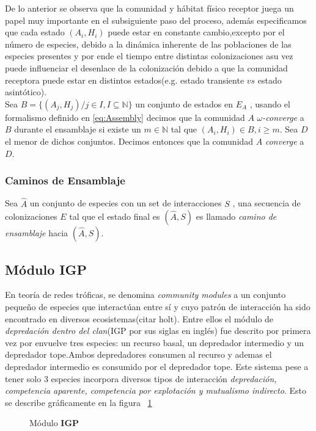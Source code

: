 De lo anterior se observa que la comunidad y h\'abitat f\'isico receptor juega un papel muy importante en el subsiguiente paso del proceso, adem\'as especificamos que cada estado $(A_i,H_i)$ puede estar en constante cambio,excepto por el n\'umero de especies, debido a la din\'amica inherente de las poblaciones de las especies presentes y por ende el tiempo entre distintas colonizaciones asu vez puede influenciar el desenlace de la colonizaci\'on debido a que la comunidad receptora puede estar en distintos estados(e.g. estado transiente $vs$ estado asint\'otico).\\

Sea $B = \{ (A_j,H_j) / j \in I, I \subseteq \mathbb{N}\}$ un conjunto de estados en $E_A$ , usando el formalismo definido en \eqref{eq:Assembly} decimos que la comunidad $A$ \emph{$\omega$-converge} a $B$ durante el ensamblaje si existe un $ m \in \mathbb{N}$ tal que $(A_i,H_i) \in B, i \geq m$. Sea $D$ el menor de dichos conjuntos. Decimos entonces que la comunidad $A$ \emph{converge} a $D$.

\subsubsection{Caminos de Ensamblaje}
Sea $\hat{A}$ un conjunto de especies con un set de interacciones $S$ , una secuencia de colonizaciones $E$ tal que el estado final es $(\hat{A},S)$ es llamado \emph{camino de ensamblaje} hacia $(\hat{A},S)$.

\subsection{ M\'odulo IGP}

En teor\'ia de redes tr\'oficas, se denomina \emph{community modules} a un conjunto peque\~no de especies que interact\'uan entre s\'i y cuyo patr\'on de interacci\'on ha sido encontrado en diversos ecosistemas(citar holt). Entre ellos el m\'odulo de \emph{depredaci\'on dentro del clan}(IGP por sus siglas en ingl\'es) fue descrito por primera vez por \cite{polis1989ecology} envuelve tres especies: un recurso basal, un depredador intermedio y un depredador tope.Ambos depredadores consumen al recurso y ademas el depredador intermedio es consumido por el depredador tope. Este sistema pese a tener solo $3$ especies incorpora diversos tipos de interacci\'on \emph{depredaci\'on, competencia aparente, competencia por explotaci\'on y mutualismo indirecto}. Esto se describe gr\'aficamente en la figura ~\ref{fig:IGP}
\begin{figure}[h]

\caption{M\'odulo \textbf{IGP}}
\label{fig:IGP}
\end{figure}

